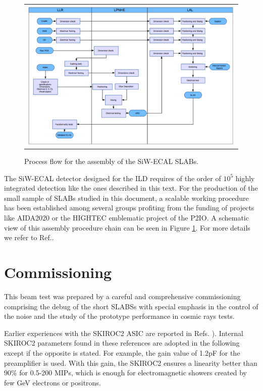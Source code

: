 \documentclass[a4paper,11pt]{article}
\begin{document}
\begin{figure}[!t]
\centering
\begin{tabular}{l}
\includegraphics[width=6.0in]{../figs/assembly.png} 
\end{tabular}
\caption{Process flow for the assembly of the SiW-ECAL SLABs.}
\label{assembly}
\end{figure}

The SiW-ECAL detector designed for the ILD requires of the order
of $10^{5}$ highly integrated detection like the ones described in this text.
For the production of the small sample of SLABs studied in this document,
a scalable working procedure has been established among several groups \cite{Boudry:2318814}
profiting from the funding of projects like AIDA2020 or the HIGHTEC emblematic project
of the P2IO. A schematic view of this assembly procedure chain can be seen in
Figure \ref{assembly}. For more details we refer to Ref.\cite{Boudry:2318814}.



\section{Commissioning}
\label{sec:commissioning}

This beam test was prepared by a careful and comprehensive commissioning comprising
the debug of the
short SLABSs with special emphasis in the control of the noise and the study of the
prototype performance in cosmic rays tests.

Earlier experiences with the SKIROC2 ASIC are reported in Refs. \cite{Amjad:2014tha,Suehara:2018mqk}). 
Internal SKIROC2 parameters found in these references are adopted in the following
except if the opposite is stated.
For example, the gain value of 1.2pF for the preamplifier is used. 
With this gain, the SKIROC2 ensures a linearity better than 90\% 
for 0.5-200 MIPs, which is enough for 
electromagnetic showers created by few GeV 
electrons or positrons.
\end{document}
